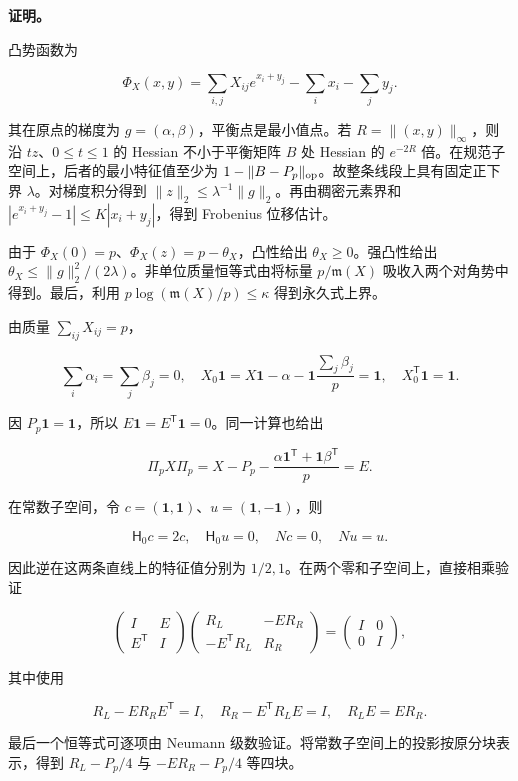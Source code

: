 \documentclass[11pt,a4paper]{article}
\begin{document}
\textbf{证明。}

凸势函数为

\[\Phi_X(x,y)=\sum_{i,j}X_{ij}e^{x_i+y_j}-\sum_i x_i-\sum_j y_j.\]

其在原点的梯度为 \(g=(\alpha,\beta)\)，平衡点是最小值点。若 \(R=\|(x,y)\|_\infty\)，则沿 \(tz\)、\(0\le t\le1\) 的 Hessian 不小于平衡矩阵 \(B\) 处 Hessian 的 \(e^{-2R}\) 倍。在规范子空间上，后者的最小特征值至少为 \(1-\|B-P_p\|_{\rm op}\)。故整条线段上具有固定正下界 \(\lambda\)。对梯度积分得到 \(\|z\|_2\le\lambda^{-1}\|g\|_2\)。再由稠密元素界和 \(|e^{x_i+y_j}-1|\le K|x_i+y_j|\)，得到 Frobenius 位移估计。

由于 \(\Phi_X(0)=p\)、\(\Phi_X(z)=p-\theta_X\)，凸性给出 \(\theta_X\ge0\)。强凸性给出 \(\theta_X\le\|g\|_2^2/(2\lambda)\)。非单位质量恒等式由将标量 \(p/\mathfrak m(X)\) 吸收入两个对角势中得到。最后，利用 \(p\log(\mathfrak m(X)/p)\le\kappa\) 得到永久式上界。

由质量 \(\sum_{ij}X_{ij}=p\)，

\[\sum_i\alpha_i=\sum_j\beta_j=0,
\quad X_0\mathbf1=X\mathbf1-\alpha-\mathbf1\frac{\sum_j\beta_j}p=\mathbf1,
\quad X_0^{\mathsf T}\mathbf1=\mathbf1.\]

因 \(P_p\mathbf1=\mathbf1\)，所以 \(E\mathbf1=E^{\mathsf T}\mathbf1=0\)。同一计算也给出

\[\Pi_pX\Pi_p=X-P_p-\frac{\alpha\mathbf1^{\mathsf T}+\mathbf1\beta^{\mathsf T}}p=E.\]

在常数子空间，令 \(c=(\mathbf1,\mathbf1)\)、\(u=(\mathbf1,-\mathbf1)\)，则

\[\mathsf H_0c=2c,\quad\mathsf H_0u=0,\quad Nc=0,\quad Nu=u.\]

因此逆在这两条直线上的特征值分别为 \(1/2,1\)。在两个零和子空间上，直接相乘验证

\[\begin{pmatrix}I&E\\E^{\mathsf T}&I\end{pmatrix}
\begin{pmatrix}R_L&-ER_R\\-E^{\mathsf T}R_L&R_R\end{pmatrix}
=\begin{pmatrix}I&0\\0&I\end{pmatrix},\]

其中使用

\[R_L-ER_RE^{\mathsf T}=I,\quad R_R-E^{\mathsf T}R_LE=I,
\quad R_LE=ER_R.\]

最后一个恒等式可逐项由 Neumann 级数验证。将常数子空间上的投影按原分块表示，得到 \(R_L-P_p/4\) 与 \(-ER_R-P_p/4\) 等四块。
\end{document}
